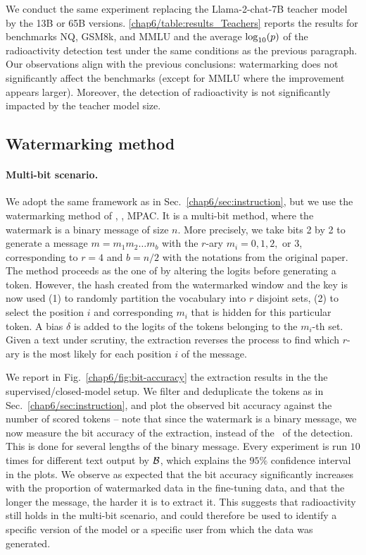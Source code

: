 We conduct the same experiment replacing the Llama-2-chat-7B teacher model by the 13B or 65B versions.
\autoref{chap6/table:results_Teachers} reports the results for benchmarks NQ, GSM8k, and MMLU and the average $\log_{10}(p)$ of the radioactivity detection test under the same conditions as the previous paragraph.
Our observations align with the previous conclusions: watermarking does not significantly affect the benchmarks (except for MMLU where the improvement appears larger). 
Moreover, the detection of radioactivity is not significantly impacted by the teacher model size.










\subsection{Watermarking method}

\paragraph{Multi-bit scenario.} 

We adopt the same framework as in Sec.~\ref{chap6/sec:instruction}, but we use the watermarking method of \cite{yoo2023advancing}, \aka, MPAC.
It is a multi-bit method, where the watermark is a binary message of size $n$.
More precisely, we take bits 2 by 2 to generate a message $m = m_1 m_2 \ldots m_b$ with the $r$-ary $m_i = 0, 1, 2,$ or $3$, corresponding to $r=4$ and $b = n/2$ with the notations from the original paper.
The method proceeds as the one of \cite{kirchenbauer2023reliability} by altering the logits before generating a token.
However, the hash created from the watermarked window and the key is now used 
(1) to randomly partition the vocabulary into $r$ disjoint sets, 
(2) to select the position $i$ and corresponding $m_i$ that is hidden for this particular token.
A bias $\delta$ is added to the logits of the tokens belonging to the $m_i$-th set.
Given a text under scrutiny, the extraction reverses the process to find which $r$-ary is the most likely for each position $i$ of the message.

We report in Fig.~\ref{chap6/fig:bit-accuracy} the extraction results in the the supervised/closed-model setup.
We filter and deduplicate the tokens as in Sec.~\ref{chap6/sec:instruction}, and plot the observed bit accuracy against the number of scored tokens -- note that since the watermark is a binary message, we now measure the bit accuracy of the extraction, instead of the \pval\ of the detection.
This is done for several lengths of the binary message. 
Every experiment is run $10$ times for different text output by $\mathcal B$, which explains the $95\%$ confidence interval in the plots.
We observe as expected that the bit accuracy significantly increases with the proportion of watermarked data in the fine-tuning data, and that the longer the message, the harder it is to extract it.
This suggests that radioactivity still holds in the multi-bit scenario, and could therefore be used to identify a specific version of the model or a specific user from which the data was generated.

